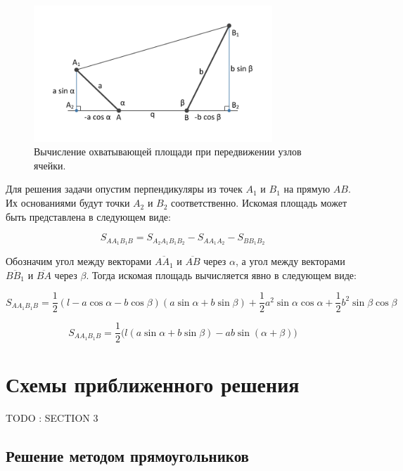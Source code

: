 \documentclass[
11pt,%
tightenlines,%
twoside,%
onecolumn,%
nofloats,%
nobibnotes,%
nofootinbib,%
superscriptaddress,%
noshowpacs,%
centertags]%
{revtex4}
\begin{document}
\begin{figure}[h]
\setcaptionmargin{5mm}
\onelinecaptionstrue
\includegraphics[width=0.8\textwidth]{pics/local.pdf}
\caption{Вычисление охватывающей площади при передвижении узлов ячейки.}
\label{fig:local}
\end{figure}

Для решения задачи опустим перпендикуляры из точек $A_1$ и $B_1$ на прямую $AB$.
Их основаниями будут точки $A_2$ и $B_2$ соответственно.
Искомая площадь может быть представлена в следующем виде:

\begin{equation}
S_{AA_1B_1B} = S_{A_2A_1B_1B_2} - S_{AA_1A_2} - S_{BB_1B_2}
\end{equation}

Обозначим угол между векторами $\overline{AA_1}$ и $\overline{AB}$ через $\alpha$, а угол между векторами $\overline{BB_1}$ и $\overline{BA}$ через $\beta$.
Тогда искомая площадь вычисляется явно в следующем виде:

\begin{equation}
S_{AA_1B_1B} = \frac{1}{2}(l - a \cos \alpha - b \cos \beta)(a \sin \alpha + b \sin \beta) + \frac{1}{2}a^2 \sin \alpha \cos \alpha + \frac{1}{2}b^2 \sin \beta \cos \beta
\end{equation}

\begin{equation}
S_{AA_1B_1B} = \frac{1}{2}\big(l(a \sin \alpha + b \sin \beta) - ab \sin(\alpha + \beta)\big)
\end{equation}

\section{Схемы приближенного решения}

TODO : SECTION 3

\subsection{Решение методом прямоугольников}
\end{document}
